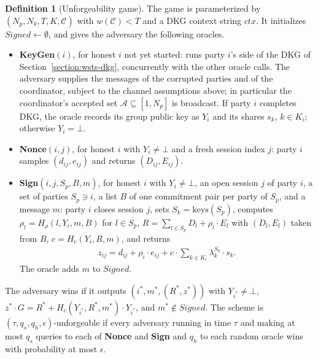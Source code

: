 \documentclass{article}
\theoremstyle{plain}
\theoremstyle{definition}
\newtheorem{definition}[thm]{Definition}
\theoremstyle{remark}
\begin{document}
\begin{definition}[Unforgeability game]\label{definition:game}
  The game is parameterized by $(N_p, N_k, T, K, \mathcal{C})$ with $w(\mathcal{C}) < T$ and a DKG context string $\mathit{ctx}$.  It initializes $\mathit{Signed} \leftarrow \emptyset$, and gives the adversary the following oracles.
  \begin{itemize}
    \item \textbf{KeyGen}$(i)$, for honest $i$ not yet started: runs party $i$'s side of the DKG of Section~\ref{section:wsts-dkg}, concurrently with the other oracle calls.  The adversary supplies the messages of the corrupted parties and of the coordinator, subject to the channel assumptions above; in particular the coordinator's accepted set $\mathcal{A} \subseteq [1, N_p]$ is broadcast.  If party $i$ completes DKG, the oracle records its group public key as $Y_i$ and its shares $s_k$, $k \in K_i$; otherwise $Y_i = \bot$.
    \item \textbf{Nonce}$(i, j)$, for honest $i$ with $Y_i \ne \bot$ and a fresh session index $j$: party $i$ samples $(d_{ij}, e_{ij})$ and returns $(D_{ij}, E_{ij})$.
    \item \textbf{Sign}$(i, j, S_p, B, m)$, for honest $i$ with $Y_i \ne \bot$, an open session $j$ of party $i$, a set of parties $S_p \ni i$, a list $B$ of one commitment pair per party of $S_p$, and a message $m$: party $i$ closes session $j$, sets $S_k = \mathrm{keys}(S_p)$, computes $\rho_l = H_\rho(l, Y_i, m, B)$ for $l \in S_p$, $R = \sum_{l \in S_p} D_l + \rho_l \cdot E_l$ with $(D_l, E_l)$ taken from $B$, $c = H_c(Y_i, R, m)$, and returns
      \begin{align}\label{equation:game-share}
        z_{ij} = d_{ij} + \rho_i \cdot e_{ij} + c \cdot \sum_{k \in K_i} \lambda_k^{S_k} \cdot s_k.
      \end{align}
      The oracle adds $m$ to $\mathit{Signed}$.
  \end{itemize}
  The adversary wins if it outputs $(i^*, m^*, (R^*, z^*))$ with $Y_{i^*} \ne \bot$, $z^* \cdot G = R^* + H_c(Y_{i^*}, R^*, m^*) \cdot Y_{i^*}$, and $m^* \notin \mathit{Signed}$.  The scheme is $(\tau, q_s, q_h, \epsilon)$-unforgeable if every adversary running in time $\tau$ and making at most $q_s$ queries to each of \textbf{Nonce} and \textbf{Sign} and $q_h$ to each random oracle wins with probability at most $\epsilon$.
\end{definition}
\end{document}
